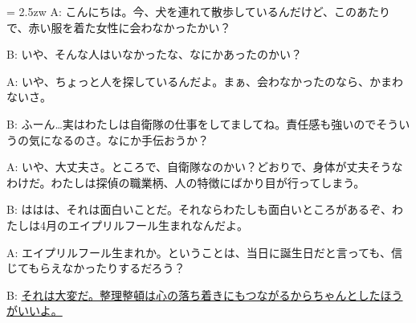 \documentclass[11pt]{amsart}
\title{}
\author{}
\newenvironment{hangall}[1]{\hangindent = 2.5zw\everypar{\hangindent = 2.5zw}}{}
\begin{document}
\maketitle
\begin{hangall}{}%
A: こんにちは。今、犬を連れて散歩しているんだけど、このあたりで、赤い服を着た女性に会わなかったかい？

B: いや、そんな人はいなかったな、なにかあったのかい？

A: いや、ちょっと人を探しているんだよ。まぁ、会わなかったのなら、かまわないさ。

B: ふーん…実はわたしは自衛隊の仕事をしてましてね。責任感も強いのでそういうの気になるのさ。なにか手伝おうか？

A: いや、大丈夫さ。ところで、自衛隊なのかい？どおりで、身体が丈夫そうなわけだ。わたしは探偵の職業柄、人の特徴にばかり目が行ってしまう。

B: ははは、それは面白いことだ。それならわたしも面白いところがあるぞ、わたしは4月のエイプリルフール生まれなんだよ。

A: エイプリルフール生まれか。ということは、当日に誕生日だと言っても、信じてもらえなかったりするだろう？

B: \ul{それは大変だ。整理整頓は心の落ち着きにもつながるからちゃんとしたほうがいいよ。}\end{hangall}
\end{document}
